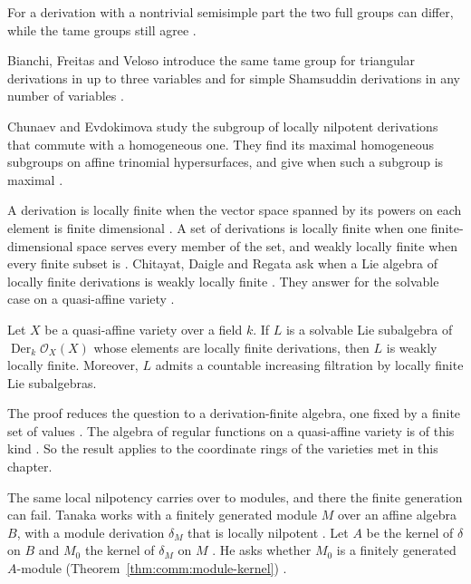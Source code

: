 For a derivation with a nontrivial semisimple part the two full groups can
differ, while the tame groups still agree
\cite[pp.~1--2]{CidVeloso2026TameIsotropy}.

Bianchi, Freitas and Veloso introduce the same tame group for triangular
derivations in up to three variables and for simple Shamsuddin derivations in
any number of variables \cite[Abstract, p.~1]{BianchiFreitasVeloso2025Tame}.

Chunaev and Evdokimova study the subgroup of locally nilpotent derivations
that commute with a homogeneous one. They find its maximal homogeneous
subgroups on affine trinomial hypersurfaces, and give when such a subgroup is
maximal \cite[Abstract, p.~1]{ChunaevEvdokimova2026}.

A derivation is locally finite when the vector space spanned by its powers on
each element is finite dimensional
\cite[Definition~2.1, p.~2]{ChitayatDaigleRegeta2026}. A set of derivations
is locally finite when one finite-dimensional space serves every member of
the set, and weakly locally finite when every finite subset is
\cite[Definition~2.1, p.~2]{ChitayatDaigleRegeta2026}. Chitayat, Daigle and
Regata ask when a Lie algebra of locally finite derivations is weakly
locally finite \cite[pp.~1--2]{ChitayatDaigleRegeta2026}. They answer for
the solvable case on a quasi-affine variety
\cite[Corollary~4, p.~2]{ChitayatDaigleRegeta2026}.

\begin{theorem}\label{thm:comm:locally-finite-solvable}
Let $X$ be a quasi-affine variety over a field $k$. If $L$ is a solvable
Lie subalgebra of $\operatorname{Der}_k \mathcal{O}_X(X)$ whose elements
are locally finite derivations, then $L$ is weakly locally finite. Moreover,
$L$ admits a countable increasing filtration by locally finite Lie
subalgebras.
\end{theorem}

The proof reduces the question to a derivation-finite algebra, one fixed by
a finite set of values \cite[p.~2]{ChitayatDaigleRegeta2026}. The algebra of
regular functions on a quasi-affine variety is of this kind
\cite[p.~4]{ChitayatDaigleRegeta2026}. So the result applies to the
coordinate rings of the varieties met in this chapter.

The same local nilpotency carries over to modules, and there the finite
generation can fail. Tanaka works with a finitely generated module $M$ over
an affine algebra $B$, with a module derivation $\delta_{M}$ that is
locally nilpotent \cite[p.~1]{Tanaka2010ModuleDerivations}. Let $A$ be the
kernel of $\delta$ on $B$ and $M_{0}$ the kernel of $\delta_{M}$ on $M$
\cite[p.~1]{Tanaka2010ModuleDerivations}. He asks whether $M_{0}$ is a
finitely generated $A$-module (Theorem~\ref{thm:comm:module-kernel}) \cite[p.~2]{Tanaka2010ModuleDerivations}.

